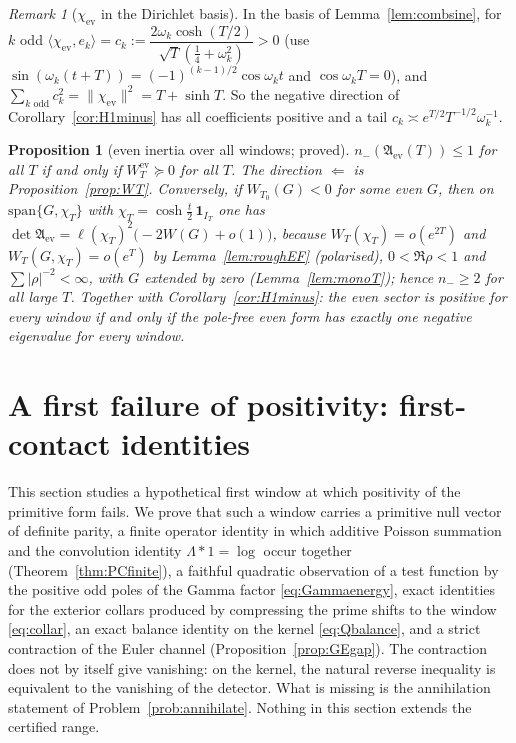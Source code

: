 \documentclass[11pt]{amsart}
\newtheorem{proposition}[theorem]{Proposition}
\theoremstyle{definition}
\theoremstyle{remark}
\newtheorem{remark}[theorem]{Remark}
\begin{document}
\begin{remark}[$\chi_{\mathrm{ev}}$ in the Dirichlet basis]\label{rem:chiev-sine}
In the basis of Lemma~\ref{lem:combsine}, for $k$ odd $\langle\chi_{\mathrm{ev}},e_k\rangle=c_k:=\dfrac{2\omega_k\cosh(T/2)}{\sqrt T(\frac14+\omega_k^2)}>0$
(use $\sin(\omega_k(t+T))=(-1)^{(k-1)/2}\cos\omega_kt$ and $\cos\omega_kT=0$), and $\sum_{k\text{ odd}}c_k^2=\|\chi_{\mathrm{ev}}\|^2=T+\sinh T$.
So the negative direction of Corollary~\ref{cor:H1minus} has all coefficients positive and a tail $c_k\asymp e^{T/2}T^{-1/2}\omega_k^{-1}$.
\end{remark}

\begin{proposition}[even inertia over all windows; proved]\label{prop:H}
$n_-(\mathfrak A_{\mathrm{ev}}(T))\le1$ for all $T$ if and only if $W^{\mathrm{ev}}_T\succeq0$ for all $T$. The direction
$\Leftarrow$ is Proposition~\ref{prop:WT}. Conversely, if $W_{T_0}(G)<0$ for some even $G$, then on
$\mathrm{span}\{G,\chi_T\}$ with $\chi_T=\cosh\frac t2\,\mathbf 1_{I_T}$ one has
$\det\mathfrak A_{\mathrm{ev}}=\ell(\chi_T)^2\big(-2W(G)+o(1)\big)$, because $W_T(\chi_T)=o(e^{2T})$ and
$W_T(G,\chi_T)=o(e^{T})$ by Lemma~\ref{lem:roughEF} (polarised), $0<\Re\rho<1$ and $\sum|\rho|^{-2}<\infty$, with $G$ extended
by zero (Lemma~\ref{lem:monoT}); hence $n_-\ge2$ for all large $T$. Together with Corollary~\ref{cor:H1minus}: the even
sector is positive for every window if and only if the pole-free even form has exactly one negative eigenvalue for every
window.
\end{proposition}

\section{A first failure of positivity: first-contact identities}\label{sec:firstcontact}

This section studies a hypothetical first window at which positivity of the primitive form fails. We
prove that such a window carries a primitive null vector of definite parity, a finite operator identity in
which additive Poisson summation and the convolution identity $\Lambda*1=\log$ occur together
(Theorem~\ref{thm:PCfinite}), a faithful quadratic observation of a test function by the positive odd poles
of the Gamma factor \eqref{eq:Gammaenergy}, exact identities for the exterior collars produced by compressing
the prime shifts to the window \eqref{eq:collar}, an exact balance identity on the kernel \eqref{eq:Qbalance},
and a strict contraction of the Euler channel (Proposition~\ref{prop:GEgap}). The contraction does not by
itself give vanishing: on the kernel, the natural reverse inequality is equivalent to the vanishing of the
detector. What is missing is the annihilation statement of Problem~\ref{prob:annihilate}. Nothing in this
section extends the certified range.
\end{document}

